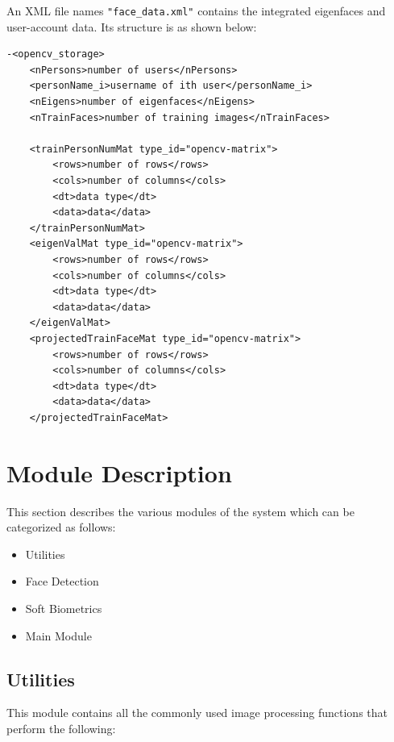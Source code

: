 \documentclass[12pt]{report}			%
\begin{document}
An XML file names \verb+"face_data.xml"+ contains the integrated eigenfaces and user-account data. Its structure is as shown below:
\begin{verbatim}
-<opencv_storage>
	<nPersons>number of users</nPersons>
	<personName_i>username of ith user</personName_i>
	<nEigens>number of eigenfaces</nEigens>
	<nTrainFaces>number of training images</nTrainFaces>
	
	<trainPersonNumMat type_id="opencv-matrix">
		<rows>number of rows</rows>
		<cols>number of columns</cols>
		<dt>data type</dt>
		<data>data</data>
	</trainPersonNumMat>
	<eigenValMat type_id="opencv-matrix">
		<rows>number of rows</rows>
		<cols>number of columns</cols>
		<dt>data type</dt>
		<data>data</data>
	</eigenValMat>
	<projectedTrainFaceMat type_id="opencv-matrix">
		<rows>number of rows</rows>
		<cols>number of columns</cols>
		<dt>data type</dt>
		<data>data</data>
	</projectedTrainFaceMat>
\end{verbatim}

\section{ Module Description }
This section describes the various modules of the system which can be categorized as follows:
\begin{itemize}
\item Utilities
\item Face Detection
\item Soft Biometrics
\item Main Module
\end{itemize}

\subsection { Utilities }
This module contains all the commonly used image processing functions that perform the following:
\end{document}

